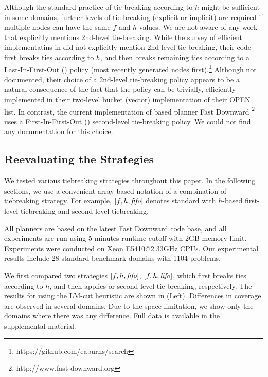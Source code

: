 Although the standard practice of tie-breaking according to $h$ might be sufficient in some domains, further levels of tie-breaking (explicit or implicit) are required if multiple nodes can have the same $f$ and $h$ values.
We are not aware of any work that explicitly mentions 2nd-level tie-breaking.
While the survey of efficient \astar implementatins in \citeauthor{burns2012implementing} did not explicitly mention 2nd-level tie-breaking, their code first breaks ties according to $h$, and then breaks remaining ties according to a Last-In-First-Out (\lifo) policy (most recently generated nodes first).\footnote{https://github.com/eaburns/search}
Although not documented, their choice of a \lifo 2nd-level tie-breaking policy appears to be a natural consequence of the fact that the \lifo policy can be trivially, efficiently implemented in their two-level bucket (vector) implementation of their OPEN list.
In contrast, the current implementation of \sota \astar based planner Fast
Downward \cite{Helmert2006}\footnote{http://www.fast-downward.org} uses a First-In-First-Out (\fifo) second-level tie-breaking policy. We could not find any documentation for this choice. 


\subsection{Reevaluating the Strategies}


We tested various tiebreaking strategies throughout this paper.  In the
following sections, we use a convenient array-based notation of a
combination of tiebreaking strategy.  For example, $[f,h,\mbox{\textit{fifo}}]$ denotes
standard \astar with $h$-based first-level tiebreaking and \fifo
second-level tiebreaking.

All planners are based on the latest Fast Downward code base, and all
experiments are run using 5 minutes runtime cutoff with 2GB memory
limit. Experiments were conducted on Xeon E5410@2.33GHz CPUs.
Our experimental results include 28 standard benchmark domains with 1104
problems.

We first compared two strategies $[f,h,\mbox{\textit{fifo}}]$, $[f,h,\mbox{\textit{lifo}}]$, which
first breaks ties according to $h$, and then applies \fifo or \lifo
second-level tie-breaking, respectively.
% 
The results for \astar using the LM-cut heuristic \cite{Helmert2009} are
shown in  (Left).
Differences in coverage are observed in several domains.
Due to the space limitation, we show only the domains
where there was any difference. Full data is available in the
supplemental material. 

